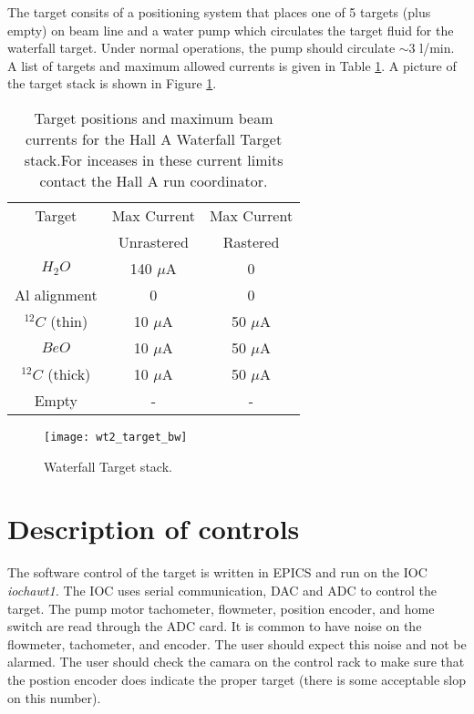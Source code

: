 The target consits of a positioning system that places one of 5 targets
(plus empty) on beam line and a water pump which circulates the target
fluid for the waterfall target. Under normal operations, the pump
should circulate $\sim 3$ l/min. A list of targets and maximum allowed
currents is given in Table \ref{tab: target-list}. A picture of the
target stack is shown in Figure \ref{fig: wt_target-stack}.%
\begin{table}
\begin{center}\begin{tabular}{|c|c|c|}
\hline 
Target&
Max Current&
Max Current\\
&
Unrastered&
Rastered\\
\hline
\hline 
$H_{2}O$&
140 $\mu $A&
0\\
\hline
Al alignment&
0&
0\\
\hline
$^{12}C$ (thin)&
10 $\mu $A&
50 $\mu $A\\
\hline
$BeO$&
10 $\mu $A&
50 $\mu $A\\
\hline
$^{12}C$ (thick)&
10 $\mu $A&
50 $\mu $A\\
\hline
Empty&
-&
-\\
\hline
\end{tabular}\end{center}


\caption{Target positions and maximum beam currents for the Hall A Waterfall
Target stack.\label{tab: target-list} For inceases in these current
limits contact the Hall A run coordinator.}
\end{table}
%
\begin{figure}
\begin{center}\texttt{[image: wt2\_target\_bw]}\end{center}


\caption{Waterfall Target stack\label{fig: wt_target-stack}.}
\end{figure}



\section{Description of controls}

The software control of the target is written in EPICS and run on
the IOC \textit{iochawt1.} The IOC uses serial communication, DAC
and ADC to control the target. The pump motor tachometer, flowmeter,
position encoder, and home switch are read through the ADC card. It
is common to have noise on the flowmeter, tachometer, and encoder.
The user should expect this noise and not be alarmed. The user should
check the camara on the control rack to make sure that the postion
encoder does indicate the proper target (there is some acceptable
slop on this number).

